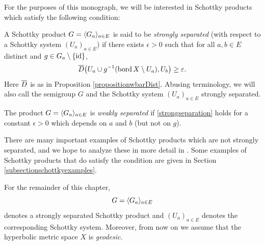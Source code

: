 For the purposes of this monograph, we will be interested in Schottky products which satisfy the following condition:

\begin{definition}
\label{definitionstrongseparation}
A Schottky product $G = \langle G_a\rangle_{a\in E}$ is said to be \emph{strongly separated} (with respect to a Schottky system $(U_a)_{a\in E}$) if there exists $\epsilon > 0$ such that for all $a,b\in E$ distinct and $g\in G_a\setminus\{\mathrm{id}\}$,
\begin{equation}
\label{strongseparation}
\overline{D}\big(U_a\cup g^{-1}(\operatorname{bord} X\setminus U_a),U_b\big) \geq \varepsilon.
\end{equation}
Here $\overline{D}$ is as in Proposition \ref{propositionwbarDist}. Abusing terminology, we will also call the semigroup $G$ and the Schottky system $(U_a)_{a\in E}$ strongly separated.

The product $G = \langle G_a\rangle_{a\in E}$ is \emph{weakly separated} if \eqref{strongseparation} holds for a constant $\epsilon > 0$ which depends on $a$ and $b$ (but not on $g$).
\end{definition}

\begin{remark}
There are many important examples of Schottky products which are not strongly separated, and we hope to analyze these in more detail in \cite{DSU2}. Some examples of Schottky products that do satisfy the condition are given in Section \ref{subsectionschottkyexamples}.
\end{remark}

\begin{standingassumptions}
For the remainder of this chapter, 
\[
G = \langle G_a\rangle_{a\in E}
\] 
denotes a strongly separated Schottky product and $(U_a)_{a\in E}$ denotes the corresponding Schottky system. Moreover, from now on we assume that the hyperbolic metric space $X$ is \emph{geodesic}.
\end{standingassumptions}

